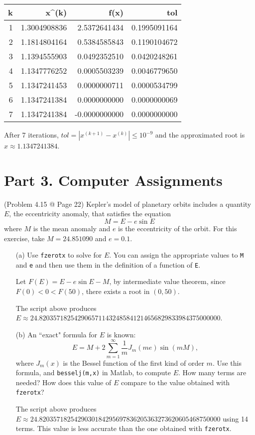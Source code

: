 \documentclass[10pt]{report}
\newcommand{\abs}[1] {\left| #1 \right|}
\begin{document}
\begin{enumerate}
\begin{enumerate}
		
		\begin{table}[H]
			\centering
			\begin{tabular}{*{4}{N}} \toprule
				k & x^{(k)} & f(x) & tol\\  & 1.3004908836 & 2.5372641434 & 0.1995091164\\
				2 & 1.1814804164 & 0.5384585843 & 0.1190104672\\
				3 & 1.1394555903 & 0.0492352510 & 0.0420248261\\
				4 & 1.1347776252 & 0.0005503239 & 0.0046779650\\
				5 & 1.1347241453 & 0.0000000711 & 0.0000534799\\
				6 & 1.1347241384 & 0.0000000000 & 0.0000000069\\
				7 & 1.1347241384 & -0.0000000000 & 0.0000000000\\
				\bottomrule
			\end{tabular}
		\end{table}
		After 7 iterations, $tol = \abs{x^{(k+1)} - x^{(k)}} \le 10^{-9}$ and the approximated root is $x\approx 1.1347241384$.
	\end{enumerate}
\end{enumerate}

\section*{Part 3. Computer Assignments}
(Problem 4.15 @ Page 22)
Kepler's model of planetary orbits includes a quantity $E$, the eccentricity anomaly, that satisfies the equation
\[
M = E - e\sin E
\]
where $M$ is the mean anomaly and $e$ is the eccentricity of the orbit. For this exercise, take $M = 24.851090$ and $e = 0.1$.
\begin{enumerate}
	\item [(a)]
	Use \texttt{fzerotx} to solve for $E$. You can assign the appropriate values to \texttt{M} and \texttt{e} and then use them in the definition of a function of \texttt{E}.
	
	Let $F(E) = E - e\sin E - M$, by intermediate value theorem, since $F(0) < 0 < F(50)$, there exists a root in $(0,50)$.
	
	The script above produces $E\approx 24.8203571825429065711432485841214656829833984375000000$.
	
	\item [(b)]
	An ``exact" formula for $E$ is known:
	\[
	E = M + 2\sum_{m=1}^{\infty} \frac{1}{m}J_m(me)\sin(mM),
	\]
	where $J_m(x)$ is the Bessel function of the first kind of order $m$. Use this formula, and \texttt{besselj(m,x)} in Matlab, to compute $E$. How many terms are needed? How does this value of $E$ compare to the value obtained with \texttt{fzerotx}?
	
	
	The script above produces $E\approx 24.8203571825429030184295697836205363273620605468750000$ using 14 terms. This value is less accurate than the one obtained with \texttt{fzerotx}.
\end{enumerate}
\end{document}
